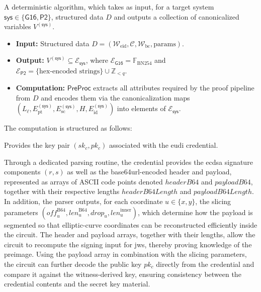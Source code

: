 \begin{definition}[Preprocessing]
	A deterministic algorithm, which takes as input, for a target system $\mathsf{sys}\in\{\mathsf{G16},\mathsf{P2}\}$, structured data $D$ and outputs a collection of canonicalized variables $V^{(\mathsf{sys})}$.
	\begin{itemize}
		\item \textbf{Input:} Structured data $D = (\mathcal{W}_{\mathrm{eid}}, \mathcal{C}, \mathcal{W}_{\mathrm{bc}}, \mathrm{params})$.
		
		\item \textbf{Output:} $V^{(\mathsf{sys})} \subseteq \mathcal{E}_{\mathsf{sys}}$, where $\mathcal{E}_{\mathsf{G16}}=\mathbb{F}_{\mathrm{BN254}}$ and $\mathcal{E}_{\mathsf{P2}}=\{\text{hex-encoded strings}\} \cup \mathbb{Z}_{<q}$.
		
		\item \textbf{Computation:} $\mathsf{PreProc}$ extracts all attributes required by the proof pipeline from $D$ and encodes them via the canonicalization maps $(L_\ell, E_{\mathrm{pt}}^{(\mathsf{sys})}, E_{\mathrm{sc}}^{(\mathsf{sys})}, H, E_{\mathrm{id}}^{(\mathsf{sys})})$ into elements of $\mathcal{E}_{\mathsf{sys}}$. 
	\end{itemize}
		
	The computation is structured as follows:
	\begin{description}[leftmargin=0cm]				
		\item[$\mathcal{W}_{\mathrm{eid}}$:] Provides the key pair $(sk_c, pk_c)$ associated with the \acrshort{eudi} credential.
						
		\item[$\mathcal{C}$:] Through a dedicated parsing routine, the credential provides the \acrshort{ecdsa} signature components $(r,s)$ as well as the base64url-encoded header and payload, represented as arrays of ASCII code points denoted $\mathit{headerB64}$ and $\mathit{payloadB64}$, together with their respective lengths $\mathit{headerB64Length}$ and $\mathit{payloadB64Length}$. In addition, the parser outputs, for each coordinate $u \in \{x,y\}$, the slicing parameters $(\mathit{off}_u^{\mathrm{B64}}, \mathit{len}_u^{\mathrm{B64}}, \mathit{drop}_u, \mathit{len}_u^{\mathrm{inner}})$, which determine how the payload is segmented so that elliptic-curve coordinates can be reconstructed efficiently inside the circuit. The header and payload arrays, together with their lengths, allow the circuit to recompute the signing input for \acrshort{jws}, thereby proving knowledge of the preimage. Using the payload array in combination with the slicing parameters, the circuit can further decode the public key $pk_c$ directly from the credential and compare it against the witness-derived key, ensuring consistency between the credential contents and the secret key material.
		

\end{description}
\end{definition}
